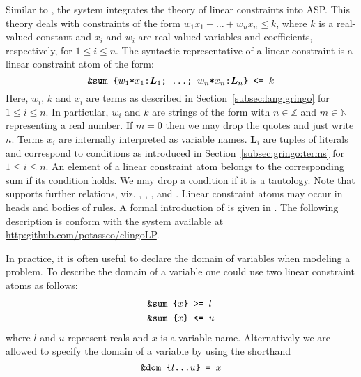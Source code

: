 Similar to , the system  integrates the theory of linear constraints into ASP.
%
This theory deals with constraints of the form $w_1x_1+\dots+w_nx_n\leq k$, 
where $k$ is a real-valued constant and $x_i$ and $w_i$ are real-valued variables and coefficients, respectively, for $1\leq i\leq n$. 
%
The syntactic representative of a linear constraint is a linear constraint atom of the form: 
\[
\texttt{\&sum\text{ }\{$w_1$*$x_1$:$\boldsymbol{L}_1$;\text{ }\dots;\text{ }$w_n$*$x_n$:$\boldsymbol{L}_n$\}\text{ }<=\text{ }$k$} 
\]
%
Here, $w_i$, $k$ and $x_i$ are terms as described in Section~\ref{subsec:lang:gringo} for $1\leq i\leq n$. 
%
In particular, $w_i$ and $k$ are strings of the form  with $n\in\mathbb{Z}$ and $m\in\mathbb{N}$ representing a real number.
%
If $m=0$ then we may drop the quotes and just write $n$.
%
Terms $x_i$ are internally interpreted as variable names. 
%
$\boldsymbol{L}_i$ are tuples of literals and correspond to conditions as introduced in Section~\ref{subsec:gringo:terms} for $1\leq i\leq n$.
%
An element of a linear constraint atom belongs to the corresponding sum if its condition holds.
%
We may drop a condition if it is a tautology. 
%
Note that  supports further relations, viz. \code{>=}, \code{<}, \code{>}, \code{=} and \code{!=}.
%
Linear constraint atoms may occur in heads and bodies of rules. 
%
A formal introduction of  is given in \cite{jakaosscscwa17a}. 
%
The following description is conform with the  system available at \url{http:github.com/potassco/clingoLP}.

In practice, it is often useful to declare the domain of variables when modeling a problem.
%
To describe the domain of a variable 
one could use two linear constraint atoms as follows:  
\begin{align*}
&\texttt{\&sum\text{ }\{$x$\}\text{ }>=\text{ }$l$}\\
&\texttt{\&sum\text{ }\{$x$\}\text{ }<=\text{ }$u$}
\end{align*}
where $l$ and $u$ represent reals and $x$ is a variable name. 
%
Alternatively we are allowed to specify the domain of a variable by using the shorthand  
\[
\texttt{\&dom\text{ }\{$l$\dots$u$\}\text{ }=\text{ }$x$}
\]


